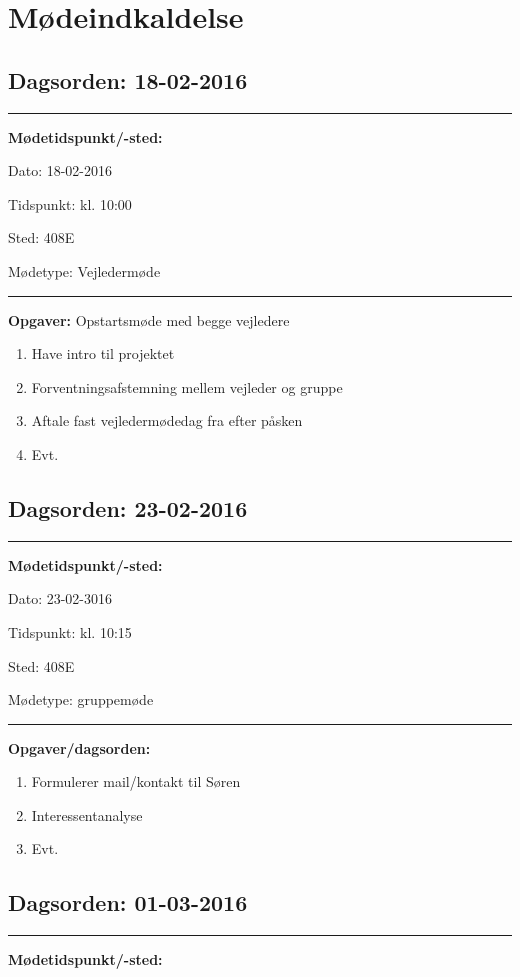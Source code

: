 \chapter{Mødeindkaldelse}

\section{Dagsorden: 18-02-2016 }
\hrule
\textbf{Mødetidspunkt/-sted:} 

Dato: \tabto{7em} 18-02-2016

Tidspunkt: \tabto{7em} kl. 10:00

Sted: \tabto{7em} 408E

Mødetype: \tabto{7em} Vejledermøde \newline


\hrule
\textbf{Opgaver:} \newline
Opstartsmøde med begge vejledere
\begin{enumerate}
\item Have intro til projektet
\item Forventningsafstemning mellem vejleder og gruppe 
\item Aftale fast vejledermødedag fra efter påsken
\item Evt. 
\end{enumerate}


\section{Dagsorden: 23-02-2016 }
\hrule
\textbf{Mødetidspunkt/-sted:} 

Dato: \tabto{7em} 23-02-3016

Tidspunkt: \tabto{7em} kl. 10:15

Sted: \tabto{7em} 408E

Mødetype: \tabto{7em} gruppemøde \newline


\hrule
\textbf{Opgaver/dagsorden:} \newline
\begin{enumerate}
	\item Formulerer mail/kontakt til Søren
	\item Interessentanalyse 
	\item Evt. 
\end{enumerate}

\newpage

\section{Dagsorden: 01-03-2016 }
\hrule
\textbf{Mødetidspunkt/-sted:} 

